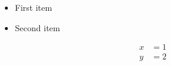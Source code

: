 \documentclass{article}
\begin{document}
\begin{itemize}
\item First item
\item Second item
\end{itemize}

\begin{align}
x&=1\\
y&=2
\end{align}
\end{document}
